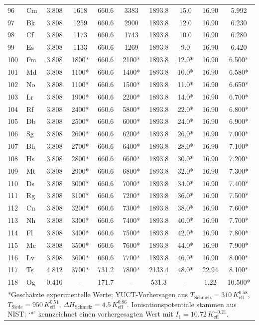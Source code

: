 \documentclass[12pt,a4paper]{article}
\theoremstyle{remark}
\begin{document}
\begin{longtable}{@{}llcccccccc@{}}
		96 & Cm  & 3.808 & 1618   & 660.6  & 3383   & 1893.8 & 15.0  & 16.90 & 5.992 \\
		97 & Bk  & 3.808 & 1259   & 660.6  & 2900   & 1893.8 & 12.0  & 16.90 & 6.230 \\
		98 & Cf  & 3.808 & 1173   & 660.6  & 1743   & 1893.8 & 10.0  & 16.90 & 6.280 \\
		99 & Es  & 3.808 & 1133   & 660.6  & 1269   & 1893.8 & 9.0   & 16.90 & 6.420 \\
		100& Fm  & 3.808 & 1800*  & 660.6  & 2100*  & 1893.8 & 12.0* & 16.90 & 6.500* \\
		101& Md  & 3.808 & 1100*  & 660.6  & 1400*  & 1893.8 & 10.0* & 16.90 & 6.580* \\
		102& No  & 3.808 & 1100*  & 660.6  & 1500*  & 1893.8 & 11.0* & 16.90 & 6.650* \\
		103& Lr  & 3.808 & 1900*  & 660.6  & 2200*  & 1893.8 & 14.0* & 16.90 & 6.700* \\
		104& Rf  & 3.808 & 2400*  & 660.6  & 5800*  & 1893.8 & 22.0* & 16.90 & 6.800* \\
		105& Db  & 3.808 & 2500*  & 660.6  & 6000*  & 1893.8 & 24.0* & 16.90 & 6.900* \\
		106& Sg  & 3.808 & 2600*  & 660.6  & 6200*  & 1893.8 & 26.0* & 16.90 & 7.000* \\
		107& Bh  & 3.808 & 2700*  & 660.6  & 6400*  & 1893.8 & 28.0* & 16.90 & 7.100* \\
		108& Hs  & 3.808 & 2800*  & 660.6  & 6600*  & 1893.8 & 30.0* & 16.90 & 7.200* \\
		109& Mt  & 3.808 & 2900*  & 660.6  & 6800*  & 1893.8 & 32.0* & 16.90 & 7.300* \\
		110& Ds  & 3.808 & 3000*  & 660.6  & 7000*  & 1893.8 & 34.0* & 16.90 & 7.400* \\
		111& Rg  & 3.808 & 3100*  & 660.6  & 7200*  & 1893.8 & 36.0* & 16.90 & 7.500* \\
		112& Cn  & 3.808 & 3200*  & 660.6  & 7300*  & 1893.8 & 38.0* & 16.90 & 7.600* \\
		113& Nh  & 3.808 & 3300*  & 660.6  & 7400*  & 1893.8 & 40.0* & 16.90 & 7.700* \\
		114& Fl  & 3.808 & 3400*  & 660.6  & 7500*  & 1893.8 & 42.0* & 16.90 & 7.800* \\
		115& Mc  & 3.808 & 3500*  & 660.6  & 7600*  & 1893.8 & 44.0* & 16.90 & 7.900* \\
		116& Lv  & 3.808 & 3600*  & 660.6  & 7700*  & 1893.8 & 46.0* & 16.90 & 8.000* \\
		117& Ts  & 4.812 & 3700*  & 731.2  & 7800*  & 2133.4 & 48.0* & 22.94 & 8.100* \\
		118& Og  & 0.410 & --     & 171.7  & --     & 531.3  & --    & 1.22  & 10.500* \\
		\bottomrule
		\multicolumn{10}{p{0.9\textwidth}}{\footnotesize
			*Geschätzte experimentelle Werte; YUCT-Vorhersagen aus \(T_{\text{Schmelz}}=310\,K_{\mathrm{eff}}^{0.58}\), 
			\(T_{\text{Siede}}=950\,K_{\mathrm{eff}}^{0.51}\), 
			\(\Delta H_{\text{Schmelz}}=4.5\,K_{\mathrm{eff}}^{0.86}\).  
			Ionisationspotentiale stammen aus NIST; `*' kennzeichnet einen vorhergesagten Wert mit \(I_1 = 10.72\,K_{\mathrm{eff}}^{-0.21}\).}
	\end{longtable}
	
\end{document}
